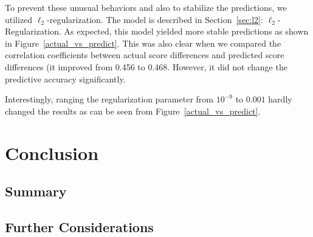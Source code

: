 \documentclass{article} %
\begin{document}
To prevent these unusual behaviors and also to stabilize the predictions, we utilized $\ell_2$-regularization.  The model is described in Section~\ref{sec:l2}: $\ell_2$-Regularization.  As expected, this model yielded more stable predictions as shown in Figure~\ref{actual_vs_predict}.  This was also clear when we compared the correlation coefficients between actual score differences and predicted score differences (it improved from 0.456 to 0.468.  However, it did not change the predictive accuracy significantly.

Interestingly, ranging the regularization parameter from $10^{-9}$ to $0.001$ hardly changed the results as can be seen from Figure~\ref{actual_vs_predict}.


\section{Conclusion}
\subsection{Summary}
\subsection{Further Considerations}






\end{document}
